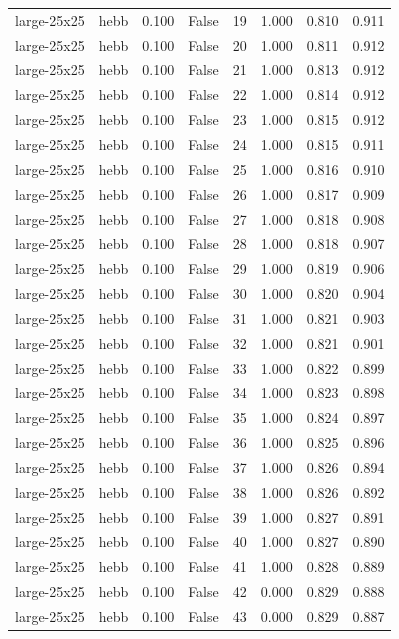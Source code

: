\begin{tabular}{llrrrrrr}
large-25x25 & hebb & 0.100 & False & 19 & 1.000 & 0.810 & 0.911 \\
large-25x25 & hebb & 0.100 & False & 20 & 1.000 & 0.811 & 0.912 \\
large-25x25 & hebb & 0.100 & False & 21 & 1.000 & 0.813 & 0.912 \\
large-25x25 & hebb & 0.100 & False & 22 & 1.000 & 0.814 & 0.912 \\
large-25x25 & hebb & 0.100 & False & 23 & 1.000 & 0.815 & 0.912 \\
large-25x25 & hebb & 0.100 & False & 24 & 1.000 & 0.815 & 0.911 \\
large-25x25 & hebb & 0.100 & False & 25 & 1.000 & 0.816 & 0.910 \\
large-25x25 & hebb & 0.100 & False & 26 & 1.000 & 0.817 & 0.909 \\
large-25x25 & hebb & 0.100 & False & 27 & 1.000 & 0.818 & 0.908 \\
large-25x25 & hebb & 0.100 & False & 28 & 1.000 & 0.818 & 0.907 \\
large-25x25 & hebb & 0.100 & False & 29 & 1.000 & 0.819 & 0.906 \\
large-25x25 & hebb & 0.100 & False & 30 & 1.000 & 0.820 & 0.904 \\
large-25x25 & hebb & 0.100 & False & 31 & 1.000 & 0.821 & 0.903 \\
large-25x25 & hebb & 0.100 & False & 32 & 1.000 & 0.821 & 0.901 \\
large-25x25 & hebb & 0.100 & False & 33 & 1.000 & 0.822 & 0.899 \\
large-25x25 & hebb & 0.100 & False & 34 & 1.000 & 0.823 & 0.898 \\
large-25x25 & hebb & 0.100 & False & 35 & 1.000 & 0.824 & 0.897 \\
large-25x25 & hebb & 0.100 & False & 36 & 1.000 & 0.825 & 0.896 \\
large-25x25 & hebb & 0.100 & False & 37 & 1.000 & 0.826 & 0.894 \\
large-25x25 & hebb & 0.100 & False & 38 & 1.000 & 0.826 & 0.892 \\
large-25x25 & hebb & 0.100 & False & 39 & 1.000 & 0.827 & 0.891 \\
large-25x25 & hebb & 0.100 & False & 40 & 1.000 & 0.827 & 0.890 \\
large-25x25 & hebb & 0.100 & False & 41 & 1.000 & 0.828 & 0.889 \\
large-25x25 & hebb & 0.100 & False & 42 & 0.000 & 0.829 & 0.888 \\
large-25x25 & hebb & 0.100 & False & 43 & 0.000 & 0.829 & 0.887 \\

\end{tabular}
